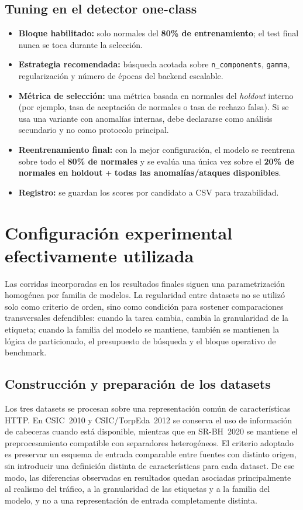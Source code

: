 \documentclass[12pt,oneside]{report}
\begin{document}
\subsection{Tuning en el detector one-class}
\begin{itemize}[leftmargin=*]
  \item \textbf{Bloque habilitado:} solo normales del \textbf{80\% de entrenamiento}; el test final nunca se toca durante la selección.
  \item \textbf{Estrategia recomendada:} búsqueda acotada sobre \texttt{n\_components}, \texttt{gamma}, regularización y número de épocas del backend escalable. 
  \item \textbf{Métrica de selección:} una métrica basada en normales del \textit{holdout} interno (por ejemplo, tasa de aceptación de normales o tasa de rechazo falsa). Si se usa una variante con anomalías internas, debe declararse como análisis secundario y no como protocolo principal.
  \item \textbf{Reentrenamiento final:} con la mejor configuración, el modelo se reentrena sobre todo el \textbf{80\% de normales} y se evalúa una única vez sobre el \textbf{20\% de normales en holdout} + \textbf{todas las anomalías/ataques disponibles}.
  \item \textbf{Registro:} se guardan los scores por candidato a CSV para trazabilidad.
\end{itemize}


\section{Configuración experimental efectivamente utilizada}
Las corridas incorporadas en los resultados finales siguen una parametrización homogénea por familia de modelos. La regularidad entre datasets no se utilizó solo como criterio de orden, sino como condición para sostener comparaciones transversales defendibles: cuando la tarea cambia, cambia la granularidad de la etiqueta; cuando la familia del modelo se mantiene, también se mantienen la lógica de particionado, el presupuesto de búsqueda y el bloque operativo de benchmark.

\subsection{Construcción y preparación de los datasets}
Los tres datasets se procesan sobre una representación común de características HTTP. En CSIC~2010 y CSIC/TorpEda~2012 se conserva el uso de información de cabeceras cuando está disponible, mientras que en SR-BH~2020 se mantiene el preprocesamiento compatible con separadores heterogéneos. El criterio adoptado es preservar un esquema de entrada comparable entre fuentes con distinto origen, sin introducir una definición distinta de características para cada dataset. De ese modo, las diferencias observadas en resultados quedan asociadas principalmente al realismo del tráfico, a la granularidad de las etiquetas y a la familia del modelo, y no a una representación de entrada completamente distinta.
\end{document}
